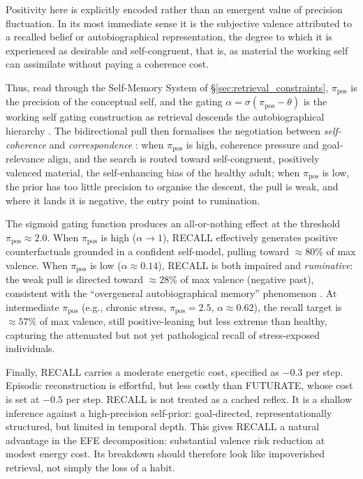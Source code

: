 \documentclass[11pt,a4paper]{article}
\newcommand{\rr}{\color{red!70!black}}
\begin{document}
{\rr Positivity here is explicitly encoded rather than an emergent value of precision fluctuation. In its most immediate sense it is the subjective valence attributed to a recalled belief or autobiographical representation, the degree to which it is experienced as desirable and self-congruent, that is, as material the working self can assimilate without paying a coherence cost.


Thus, read through the Self-Memory System of \S\ref{sec:retrieval_constraints}, $\pi_{\text{pos}}$ is the precision of the conceptual self, and the gating $\alpha = \sigma(\pi_{\text{pos}} - \theta)$ is the working self gating construction as retrieval descends the autobiographical hierarchy \citep{conwaypleydellpearce2000, conway2005}. The bidirectional pull then formalises the negotiation between \emph{self-coherence} and \emph{correspondence} \citep{conwaysingertagini2004}: when $\pi_{\text{pos}}$ is high, coherence pressure and goal-relevance align, and the search is routed toward self-congruent, positively valenced material, the self-enhancing bias of the healthy adult; when $\pi_{\text{pos}}$ is low, the prior has too little precision to organise the descent, the pull is weak, and where it lands it is negative, the entry point to rumination. 
}


The sigmoid gating function produces an all-or-nothing effect at the threshold $\pi_{\text{pos}} \approx 2.0$. When $\pi_{\text{pos}}$ is high ($\alpha \to 1$), RECALL effectively generates positive counterfactuals grounded in a confident self-model, pulling toward $\approx 80\%$ of max valence. When $\pi_{\text{pos}}$ is low ($\alpha \approx 0.14$), RECALL is both impaired and \emph{ruminative}: the weak pull is directed toward $\approx 28\%$ of max valence (negative past), consistent with the ``overgeneral autobiographical memory'' phenomenon \citep{williams2007autobiographical}. %
At intermediate $\pi_{\text{pos}}$ (e.g., chronic stress, $\pi_{\text{pos}} = 2.5$, $\alpha \approx 0.62$), the recall target is $\approx 57\%$ of max valence, still positive-leaning but less extreme than healthy, capturing the attenuated but not yet pathological recall of stress-exposed individuals. %

Finally, RECALL carries a moderate energetic cost, specified as $-0.3$ per step. Episodic reconstruction is effortful, but less costly than FUTURATE, whose cost is set at $-0.5$ per step. RECALL is not treated as a cached reflex. It is a shallow inference against a high-precision self-prior: goal-directed, representationally structured, but limited in temporal depth. This gives RECALL a natural advantage in the EFE decomposition: substantial valence risk reduction at modest energy cost. Its breakdown should therefore look like impoverished retrieval, not simply the loss of a habit.
\end{document}
